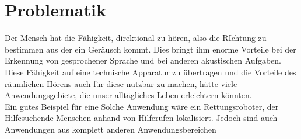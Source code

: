   \section{Problematik}
    Der Mensch hat die Fähigkeit, direktional zu hören, also die RIchtung zu bestimmen aus der ein Geräusch kommt. Dies bringt ihm enorme Vorteile bei der Erkennung von gesprochener Sprache und bei anderen akustischen Aufgaben. Diese Fähigkeit auf eine technische Apparatur zu übertragen und die Vorteile des räumlichen Hörens auch für diese nutzbar zu machen, hätte viele Anwendungsgebiete, die unser alltägliches Leben erleichtern könnten.\\
  Ein gutes Beispiel für eine Solche Anwendung wäre ein Rettungsroboter, der Hilfesuchende Menschen anhand von Hilferufen lokalisiert.
  Jedoch sind auch Anwendungen aus komplett anderen Anwendungsbereichen

